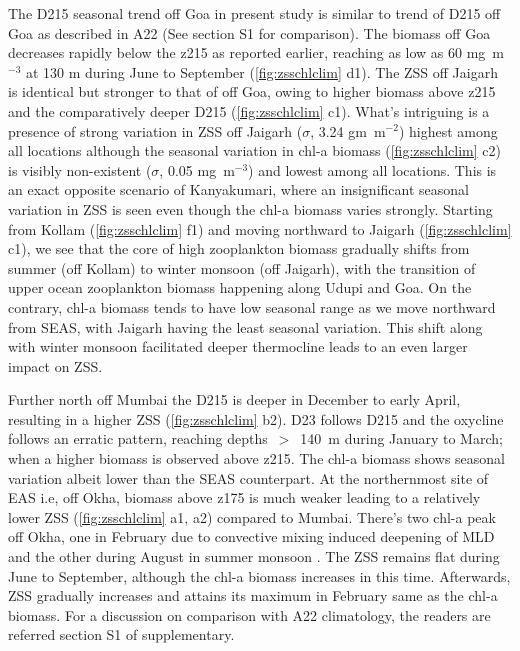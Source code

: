 \documentclass{article}
\begin{document}
	The D215 seasonal trend off Goa in present study is similar to trend of D215 off Goa as described in A22 (See section S1 for comparison). The biomass off Goa decreases rapidly below the z215 as reported earlier, reaching as low as 60 mg~m$^{-3}$ at 130 m during June to September (\cref{fig:zsschlclim} d1). The ZSS off Jaigarh is identical but stronger to that of off Goa, owing to higher biomass above z215 and the comparatively deeper D215 (\cref{fig:zsschlclim} c1). What's intriguing is a presence of strong variation in ZSS off Jaigarh ($\sigma$, 3.24 gm~m$^{-2}$) highest among all locations although the seasonal variation in chl-a biomass (\cref{fig:zsschlclim} c2) is visibly non-existent ($\sigma$, 0.05 mg~m$^{-3}$) and lowest among all locations. This is an exact opposite scenario of Kanyakumari, where an insignificant seasonal variation in ZSS is seen even though the chl-a biomass varies strongly. Starting from Kollam (\cref{fig:zsschlclim} f1) and moving northward to Jaigarh (\cref{fig:zsschlclim} c1), we see that the core of high zooplankton biomass gradually shifts from summer (off Kollam) to winter monsoon (off Jaigarh), with the transition of upper ocean zooplankton biomass happening along Udupi and Goa. On the contrary, chl-a biomass tends to have low seasonal range as we move northward from SEAS, with Jaigarh having the least seasonal variation. This shift along with winter monsoon facilitated deeper thermocline leads to an even larger impact on ZSS.
	
	Further north off Mumbai the D215 is deeper in December to early April, resulting in a higher ZSS (\cref{fig:zsschlclim} b2). D23 follows D215 and the oxycline follows an erratic pattern, reaching depths~$>$~140~m during January to March; when a higher biomass is observed above z215. The chl-a biomass shows seasonal variation albeit lower than the SEAS counterpart. At the northernmost site of EAS i.e, off Okha, biomass above z175 is much weaker leading to a relatively lower ZSS (\cref{fig:zsschlclim} a1, a2) compared to Mumbai.  There's two chl-a peak off Okha, one in February due to convective mixing induced deepening of MLD \citep{wiggert2005monsoon,levy2007basin,keerthi2017physical,shankar2016inhibition} and the other during August in summer monsoon \citep{wiggert2005monsoon,levy2007basin}. The ZSS remains flat during June to September, although the chl-a biomass increases in this time.  Afterwards, ZSS gradually increases and attains its maximum in February same as the chl-a biomass. For a discussion on comparison with A22 climatology, the readers are referred section S1 of supplementary.
	 
\end{document}
